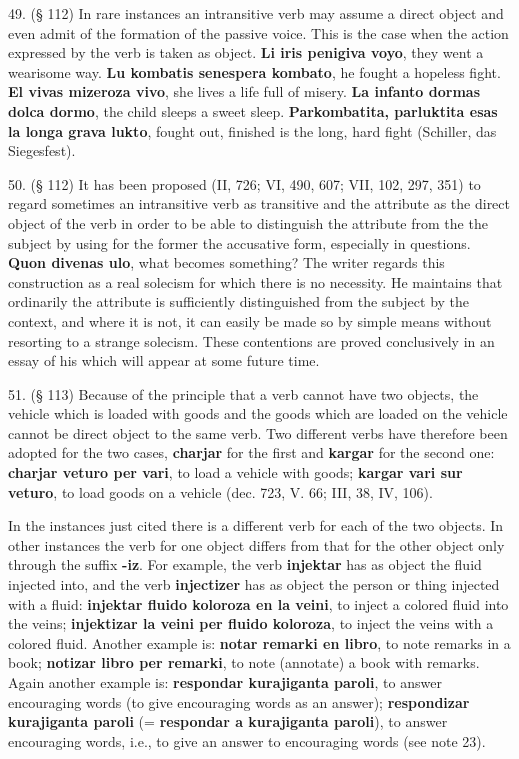 49. (§ 112) In rare instances an intransitive verb may assume a direct object and even admit of the formation of the passive voice. This is the case when the action expressed by the verb is taken as object. \textbf{Li iris penigiva voyo}, they went a wearisome way. \textbf{Lu kombatis senespera kombato}, he fought a hopeless fight. \textbf{El vivas mizeroza vivo}, she lives a life full of misery. \textbf{La infanto dormas dolca dormo}, the child sleeps a sweet sleep. \textbf{Parkombatita, parluktita esas la longa grava lukto}, fought out, finished is the long, hard fight (Schiller, das Siegesfest). %

50. (§ 112) It has been proposed (II, 726; VI, 490, 607; VII, 102, 297, 351) to regard sometimes an intransitive verb as transitive and the attribute as the direct object of the verb in order to be able to distinguish the attribute from the the subject by using for the former the accusative form, especially in questions. \textbf{Quon divenas ulo}, what becomes something? The writer regards this construction as a real solecism for which there is no necessity. He maintains that ordinarily the attribute is sufficiently distinguished from the subject by the context, and where it is not, it can easily be made so by simple means without resorting to a strange solecism. These contentions are proved conclusively in an essay of his which will appear at some future time. %

51. (§ 113) Because of the principle that a verb cannot have two objects, the vehicle which is loaded with goods and the goods which are loaded on the vehicle cannot be direct object to the same verb. Two different verbs have therefore been adopted for the two cases, \textbf{charjar} for the first and \textbf{kargar} for the second one: \textbf{charjar veturo per vari}, to load a vehicle with goods; \textbf{kargar vari sur veturo}, to load goods on a vehicle (dec. 723, V. 66; III, 38, IV, 106). %

In the instances just cited there is a different verb for each of the two objects. In other instances the verb for one object differs from that for the other object only through the suffix \textbf{-iz}. For example, the verb \textbf{injektar} has as object the fluid injected into, and the verb \textbf{injectizer} has as object the person or thing injected with a fluid: \textbf{injektar fluido koloroza en la veini}, to inject a colored fluid into the veins; \textbf{injektizar la veini per fluido koloroza}, to inject the veins with a colored fluid. Another example is: \textbf{notar remarki en libro}, to note remarks in a book; \textbf{notizar libro per remarki}, to note (annotate) a book with remarks. Again another example is: \textbf{respondar kurajiganta paroli}, to answer encouraging words (to give encouraging words as an answer); \textbf{respondizar kurajiganta paroli} (= \textbf{respondar a kurajiganta paroli}), to answer encouraging words, i.e., to give an answer to encouraging words (see note 23).

